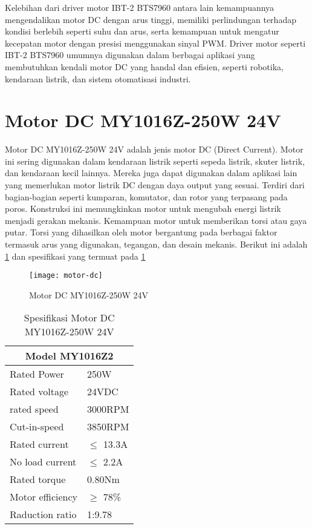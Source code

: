 Kelebihan dari driver motor IBT-2 BTS7960 antara lain kemampuannya mengendalikan motor DC dengan arus tinggi, memiliki perlindungan terhadap kondisi berlebih seperti suhu dan arus, serta kemampuan untuk mengatur kecepatan motor dengan presisi menggunakan sinyal PWM. Driver motor seperti IBT-2 BTS7960 umumnya digunakan dalam berbagai aplikasi yang membutuhkan kendali motor DC yang handal dan efisien, seperti robotika, kendaraan listrik, dan sistem otomatisasi industri.

\section{Motor DC MY1016Z-250W 24V}
Motor DC MY1016Z-250W 24V adalah jenis motor DC (Direct Current). Motor ini sering digunakan dalam kendaraan listrik seperti sepeda listrik, skuter listrik, dan kendaraan kecil lainnya. Mereka juga dapat digunakan dalam aplikasi lain yang memerlukan motor listrik DC dengan daya output yang sesuai. Terdiri dari bagian-bagian seperti kumparan, komutator, dan rotor yang terpasang pada poros. Konstruksi ini memungkinkan motor untuk mengubah energi listrik menjadi gerakan mekanis. Kemampuan motor untuk memberikan torsi atau gaya putar. Torsi yang dihasilkan oleh motor bergantung pada berbagai faktor termasuk arus yang digunakan, tegangan, dan desain mekanis. Berikut ini adalah \cref{fig:motordc} dan spesifikasi yang termuat pada \cref{tab:spesifikasi-motor}

\begin{figure}[H]
	\centering
	\texttt{[image: motor-dc]}
	\caption{Motor DC MY1016Z-250W 24V}
	\label{fig:motordc}
\end{figure}

\begin{table}[H]
	\caption{Spesifikasi Motor DC MY1016Z-250W 24V}
	\label{tab:spesifikasi-motor}
	\centering
	\begin{tabular}{|ll|}
		\hline
		\multicolumn{2}{|c|}{Model  MY1016Z2}            \\ \hline
		\multicolumn{1}{|l|}{Rated Power}      & 250W    \\ \hline
		\multicolumn{1}{|l|}{Rated voltage}    & 24VDC   \\ \hline
		\multicolumn{1}{|l|}{rated speed}      & 3000RPM \\ \hline
		\multicolumn{1}{|l|}{Cut-in-speed}     & 3850RPM \\ \hline
		\multicolumn{1}{|l|}{Rated current}    & $\leq$ 13.3A \\ \hline
		\multicolumn{1}{|l|}{No load current}  & $\leq$ 2.2A  \\ \hline
		\multicolumn{1}{|l|}{Rated torque}     & 0.80Nm  \\ \hline
		\multicolumn{1}{|l|}{Motor efficiency} & $\geq$ 78\%  \\ \hline
		\multicolumn{1}{|l|}{Raduction ratio}  & 1:9.78  \\ \hline
	\end{tabular}
\end{table}
